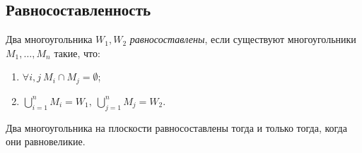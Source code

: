 \subsection{Равносоставленность}
\begin{definition}
    Два многоугольника $W_1, W_2$ \textit{равносоставлены}, если существуют многоугольники $M_1, \dots, M_n$ такие, что:
    \begin{enumerate}
        \item $\forall i, j \ M_i \cap M_j = \emptyset$;
        \item $\bigcup_{i=1}^n M_i = W_1, \ \bigcup_{j=1}^n M_j = W_2$.
    \end{enumerate} 
\end{definition}

\begin{theorem}
    Два многоугольника на плоскости равносоставлены тогда и только тогда, когда они равновеликие.
\end{theorem}
